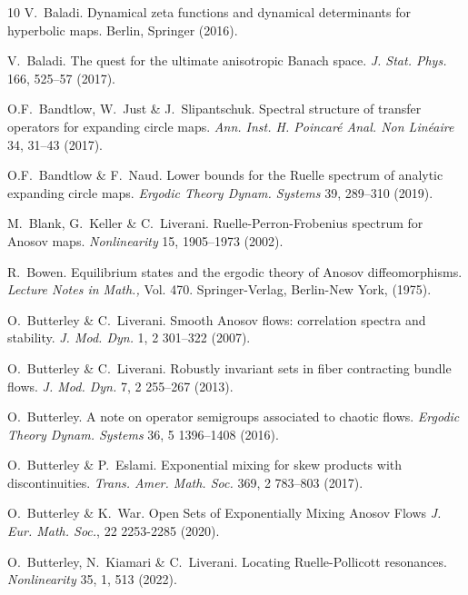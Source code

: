 \documentclass[a4paper,11pt]{amsart}
\theoremstyle{remark}
\begin{document}
\begin{thebibliography}{10}
    V.~Baladi.
    Dynamical zeta functions and dynamical determinants for hyperbolic maps.
    Berlin, Springer (2016).

    V.~Baladi.
    The quest for the ultimate anisotropic Banach space.
    \emph{J. Stat. Phys.} 166, 525--57 (2017).

    O.F.~Bandtlow, W.~Just \& J.~Slipantschuk.
    Spectral structure of transfer operators for expanding circle maps.
    \emph{Ann. Inst. H. Poincaré Anal. Non Linéaire} 34, 31--43 (2017).

    O.F.~Bandtlow \& F.~Naud.
    Lower bounds for the Ruelle spectrum of analytic expanding circle maps.
    \emph{Ergodic Theory Dynam. Systems} 39, 289--310 (2019).

    M.~Blank, G.~Keller \& C.~Liverani.
    Ruelle-Perron-Frobenius spectrum for Anosov maps.
    \emph{Nonlinearity} 15, 1905--1973 (2002).

    R.~Bowen.
    Equilibrium states and the ergodic theory of Anosov diffeomorphisms.
    \emph{Lecture Notes in Math.,} Vol. 470. 
    Springer-Verlag, Berlin-New York, (1975).

    O.~Butterley \& C.~Liverani.
    Smooth Anosov flows: correlation spectra and stability.
    \emph{J. Mod. Dyn.} 1, 2 301--322 (2007).

    O.~Butterley \& C.~Liverani.
    Robustly invariant sets in fiber contracting bundle flows.
    \emph{J. Mod. Dyn.} 7, 2 255--267 (2013).

    O.~Butterley.
    A note on operator semigroups associated to chaotic flows.
    \emph{Ergodic Theory Dynam. Systems} 36, 5 1396--1408 (2016).

    O.~Butterley \& P.~Eslami.
    Exponential mixing for skew products with discontinuities.
    \emph{Trans. Amer. Math. Soc.} 369, 2 783--803 (2017).

    O.~Butterley \& K.~War.
    Open Sets of Exponentially Mixing Anosov Flows
    \emph{J. Eur. Math. Soc.}, 22 2253-2285 (2020). 

    O.~Butterley, N.~Kiamari \& C.~Liverani.
    Locating Ruelle-Pollicott resonances. \emph{Nonlinearity} 35, 1, 513 (2022).


\end{thebibliography}
\end{document}
